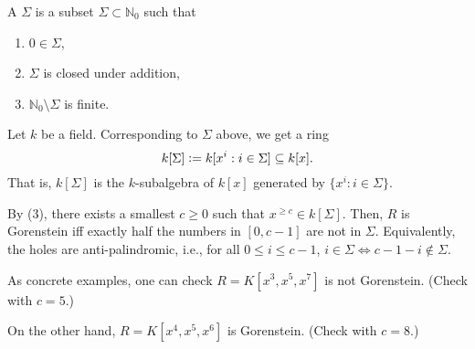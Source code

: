 \documentclass[12pt]{article}
\begin{document}
\begin{ex}
	A  $\Sigma$ is a subset $\Sigma \subset \mathbb{N}_{0}$ such that
	\begin{enumerate}[label=(\arabic*)]
		\item $0 \in \Sigma$,
		\item $\Sigma$ is closed under addition,
		\item $\mathbb{N}_{0} \setminus \Sigma$ is finite.
	\end{enumerate}

	Let $k$ be a field. Corresponding to $\Sigma$ above, we get a ring
	\begin{equation*} 
		k[\Sigma] \vcentcolon= k[x^{i} : i \in \Sigma] \subset k[x].
	\end{equation*}
	That is, $k[\Sigma]$ is the $k$-subalgebra of $k[x]$ generated by $\{x^{i} : i \in \Sigma\}$. 

	By (3), there exists a smallest $c \ge 0$ such that $x^{\ge c} \in k[\Sigma]$. Then, $R$ is Gorenstein iff exactly half the numbers in $[0, c - 1]$ are not in $\Sigma$. Equivalently, the holes are anti-palindromic, i.e., for all $0 \le i \le c - 1$, $i \in \Sigma \Leftrightarrow c - 1 - i \notin \Sigma$.
\end{ex}

\begin{ex}
	As concrete examples, one can check $R = K[x^{3}, x^{5}, x^{7}]$ is not Gorenstein. (Check with $c = 5$.)

	On the other hand, $R = K[x^{4}, x^{5}, x^{6}]$ is Gorenstein. (Check with $c = 8$.)
\end{ex}

\begin{comment}
\section{References}

Two good papers for exposition and examples of Gorenstein rings are:
\begin{itemize}
	\item `On the ubiquity of Gorenstein rings' by \emph{Hyman Bass}.
	\item `Hyman Bass and Ubiquity: Gorenstein Rings' by \emph{Craig Huneke}.
\end{itemize}

The material for this talk was mainly prepared using the material I learnt from a course on commutative algebra that I took under Professor Srikanth Iyengar at the University of Utah. 
\end{comment}
\end{document}
